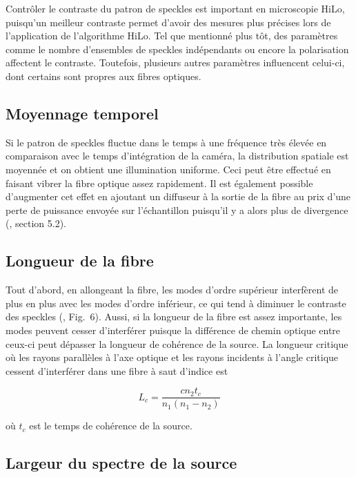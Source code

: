\documentclass{article}       %
\begin{document}
Contrôler le contraste du patron de speckles est important en microscopie HiLo, puisqu'un meilleur contraste permet d'avoir des mesures plus précises lors de l'application de l'algorithme HiLo. Tel que mentionné plus tôt, des paramètres comme le nombre d'ensembles de speckles indépendants ou encore la polarisation affectent le contraste. Toutefois, plusieurs autres paramètres influencent celui-ci, dont certains sont propres aux fibres optiques.

\subsection{Moyennage temporel}

Si le patron de speckles fluctue dans le temps à une fréquence très élevée en comparaison avec le temps d'intégration de la caméra, la distribution spatiale est moyennée et on obtient une illumination uniforme. Ceci peut être effectué en faisant vibrer la fibre optique assez rapidement. Il est également possible d'augmenter cet effet en ajoutant un diffuseur à la sortie de la fibre au prix d'une perte de puissance envoyée sur l'échantillon puisqu'il y a alors plus de divergence (\cite{Manuel}, section 5.2).

\subsection{Longueur de la fibre}

Tout d'abord, en allongeant la fibre, les modes d'ordre supérieur interfèrent de plus en plus avec les modes d'ordre inférieur, ce qui tend à diminuer le contraste des speckles (\cite{FiberStats}, Fig.~6). Aussi, si la longueur de la fibre est assez importante, les modes peuvent cesser d'interférer puisque la différence de chemin optique entre ceux-ci peut dépasser la longueur de cohérence de la source. La longueur critique où les rayons parallèles à l'axe optique et les rayons incidents à l'angle critique cessent d'interférer dans une fibre à saut d'indice est \cite{Coherence}

\begin{equation*}
    L_{c} = \frac{c n_{2} t_{c}}{n_{1}(n_{1} - n_{2})}
\end{equation*}

où $t_c$ est le temps de cohérence de la source.

\subsection{Largeur du spectre de la source}
\end{document}
